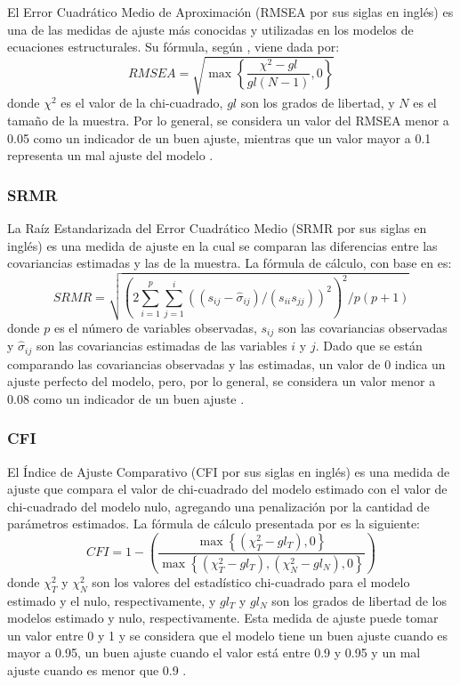 \documentclass[english]{revcoles}
\begin{document}
El Error Cuadrático Medio de Aproximación (RMSEA por sus siglas en inglés) es una de las medidas de ajuste más conocidas y utilizadas en los modelos de ecuaciones estructurales. Su fórmula, según , viene dada por:
\[
  RMSEA = \sqrt{\max\left\{\frac{\chi^2 - gl}{gl (N-1)} , 0 \right\}}
\]
donde \(\chi^2\) es el valor de la chi-cuadrado, \(gl\) son los grados de libertad, y \(N\) es el tamaño de la muestra. Por lo general, se considera un valor del RMSEA menor a 0.05 como un indicador de un buen ajuste, mientras que un valor mayor a 0.1 representa un mal ajuste del modelo \cite{Kenny2015}.

\subsubsection{SRMR}

La Raíz Estandarizada del Error Cuadrático Medio (SRMR por sus siglas en inglés) es una medida de ajuste en la cual se comparan las diferencias entre las covariancias estimadas y las de la muestra. La fórmula de cálculo, con base en  es:
\[
  SRMR = \sqrt{\left(2 \sum\limits_{i=1}^p \sum\limits_{j=1}^i \left((s_{ij} - \hat\sigma_{ij}) / (s_{ii} s_{jj}) \right)^2 \right)^2 / p(p+1)}
\]
donde \(p\) es el número de variables observadas, \(s_{ij}\) son las covariancias observadas y \(\hat\sigma_{ij}\) son las covariancias estimadas de las variables \(i\) y \(j\). Dado que se están comparando las covariancias observadas y las estimadas, un valor de 0 indica un ajuste perfecto del modelo, pero, por lo general, se considera un valor menor a 0.08 como un indicador de un buen ajuste \cite{Kenny2015}.

\subsubsection{CFI}

El Índice de Ajuste Comparativo (CFI por sus siglas en inglés) es una medida de ajuste que compara el valor de chi-cuadrado del modelo estimado con el valor de chi-cuadrado del modelo nulo, agregando una penalización por la cantidad de parámetros estimados. La fórmula de cálculo presentada por  es la siguiente:
\[
  CFI = 1 - \left( \frac{\max \left\{(\chi^2_T - gl_T), 0  \right\}}{\max \left\{(\chi^2_T - gl_T), (\chi^2_N - gl_N), 0 \right\}} \right)
\]
donde \(\chi^2_T\) y \(\chi^2_N\) son los valores del estadístico chi-cuadrado para el modelo estimado y el nulo, respectivamente, y \(gl_T\) y \(gl_N\) son los grados de libertad de los modelos estimado y nulo, respectivamente. Esta medida de ajuste puede tomar un valor entre 0 y 1 y se considera que el modelo tiene un buen ajuste cuando es mayor a 0.95, un buen ajuste cuando el valor está entre 0.9 y 0.95 y un mal ajuste cuando es menor que 0.9 \cite{Kenny2015}.
\end{document}
